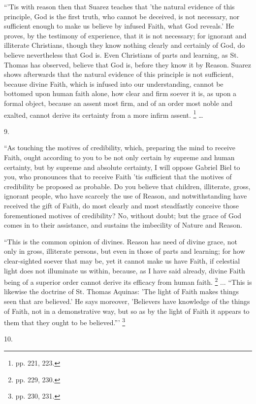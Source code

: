 ``'Tis with reason then that Suarez teaches that 'the natural
evidence of this principle, God is the first truth, who cannot be
deceived, is not necessary, nor sufficient enough to make us believe
by infused Faith, what God reveals.' He proves, by the testimony of
experience, that it is not necessary; for ignorant and illiterate
Christians, though they know nothing clearly and certainly of God, do
believe nevertheless that God is. Even Christians of parts and
learning, as St. Thomas has observed, believe that God is, before they
know it by Reason. Suarez shows afterwards that the natural evidence
of this principle is not sufficient, because divine Faith, which is
infused into our understanding, cannot be bottomed upon human faith
alone, how clear and firm soever it is, as upon a formal object,
because an assent most firm, and of an order most noble and exalted,
cannot derive its certainty from a more infirm assent. \footnote{pp. 221, 223.} …

9.

``As touching the motives of credibility, which, preparing the
mind to receive Faith, ought according to you to be not only certain
by supreme and human certainty, but by supreme and absolute certainty,
I will oppose Gabriel Biel to you, who pronounces that to receive
Faith 'tis sufficient that the motives of credibility be proposed as
probable. Do you believe that children, illiterate, gross, ignorant
people, who have scarcely the use of Reason, and notwithstanding have
received the gift of Faith, do most clearly and most steadfastly
conceive those forementioned motives of credibility? No, without
doubt; but the grace of God comes in to their assistance, and sustains
the imbecility of Nature and Reason.

``This is the common opinion of divines. Reason has need of
divine grace, not only in gross, illiterate persons, but even in those
of parts and learning; for how clear-sighted soever that may be, yet
it cannot make us have Faith, if celestial light does not illuminate
us within, because, as I have said already, divine Faith being of a
superior order cannot derive its efficacy from human faith. \footnote{pp. 229, 230.} ... ``This is likewise the doctrine of St. Thomas
Aquinas: 'The light of Faith makes things seen that are believed.' He
says moreover, 'Believers have knowledge of the things of Faith, not
in a demonstrative way, but so as by the light of Faith it appears to
them that they ought to be believed.''' \footnote{pp. 230, 231.}

10.

